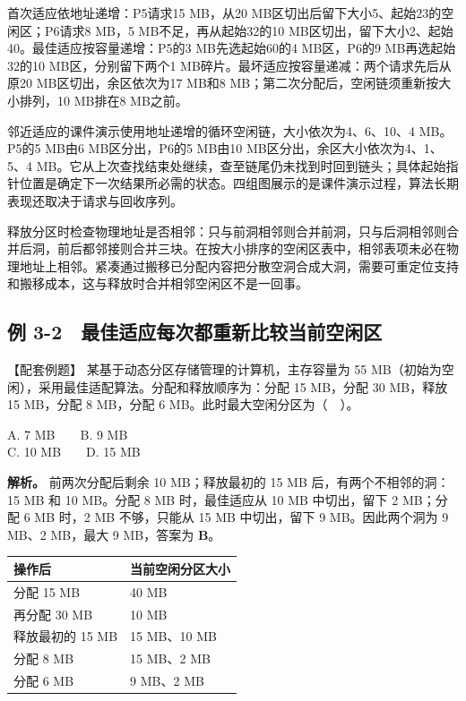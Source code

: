 首次适应依地址递增：P5请求15 MB，从20 MB区切出后留下大小5、起始23的空闲区；P6请求8 MB，5 MB不足，再从起始32的10 MB区切出，留下大小2、起始40。最佳适应按容量递增：P5的3 MB先选起始60的4 MB区，P6的9 MB再选起始32的10 MB区，分别留下两个1 MB碎片。最坏适应按容量递减：两个请求先后从原20 MB区切出，余区依次为17 MB和8 MB；第二次分配后，空闲链须重新按大小排列，10 MB排在8 MB之前。

邻近适应的课件演示使用地址递增的循环空闲链，大小依次为4、6、10、4 MB。P5的5 MB由6 MB区分出，P6的5 MB由10 MB区分出，余区大小依次为4、1、5、4 MB。它从上次查找结束处继续，查至链尾仍未找到时回到链头；具体起始指针位置是确定下一次结果所必需的状态。四组图展示的是课件演示过程，算法长期表现还取决于请求与回收序列。

释放分区时检查物理地址是否相邻：只与前洞相邻则合并前洞，只与后洞相邻则合并后洞，前后都邻接则合并三块。在按大小排序的空闲区表中，相邻表项未必在物理地址上相邻。紧凑通过搬移已分配内容把分散空洞合成大洞，需要可重定位支持和搬移成本，这与释放时合并相邻空闲区不是一回事。

\subsection{例 3-2　最佳适应每次都重新比较当前空闲区}\label{OS03-ex5-2}

\begin{example}[配套例题]

【配套例题】 某基于动态分区存储管理的计算机，主存容量为 55 MB（初始为空闲），采用最佳适配算法。分配和释放顺序为：分配 15 MB，分配 30 MB，释放 15 MB，分配 8 MB，分配 6 MB。此时最大空闲分区为（　）。

A. 7 MB　　B. 9 MB\\
C. 10 MB　　D. 15 MB

\end{example}

\textbf{解析。} 前两次分配后剩余 10 MB；释放最初的 15 MB 后，有两个不相邻的洞：15 MB 和 10 MB。分配 8 MB 时，最佳适应从 10 MB 中切出，留下 2 MB；分配 6 MB 时，2 MB 不够，只能从 15 MB 中切出，留下 9 MB。因此两个洞为 9 MB、2 MB，最大 9 MB，答案为 \textbf{B}。

\begin{wideblock}

\par\medskip\noindent\begin{minipage}{\linewidth}\fontsize{9.3}{12}\selectfont\begin{tabularx}{\linewidth}{@{}YY@{}}
\toprule\noalign{}
操作后 & 当前空闲分区大小 \\
\midrule\noalign{}


分配 15 MB & 40 MB \\
再分配 30 MB & 10 MB \\
释放最初的 15 MB & 15 MB、10 MB \\
分配 8 MB & 15 MB、2 MB \\
分配 6 MB & 9 MB、2 MB \\
\bottomrule\end{tabularx}
\end{minipage}\par\medskip

\end{wideblock}

